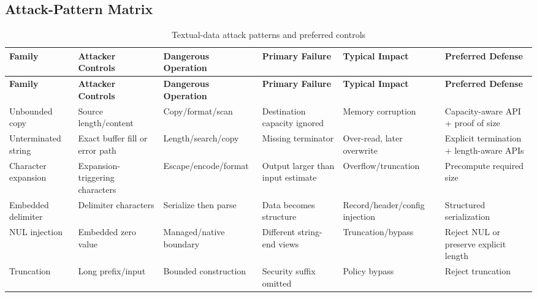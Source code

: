 \documentclass[11pt]{article}
\begin{document}
\begin{landscape}
\section{Attack-Pattern Matrix}

\small
\begin{longtable}{>{\raggedright\arraybackslash}p{\dimexpr 0.15217\dimexpr\linewidth-12\tabcolsep\relax\relax} >{\raggedright\arraybackslash}p{\dimexpr 0.15217\dimexpr\linewidth-12\tabcolsep\relax\relax} >{\raggedright\arraybackslash}p{\dimexpr 0.18478\dimexpr\linewidth-12\tabcolsep\relax\relax} >{\raggedright\arraybackslash}p{\dimexpr 0.18478\dimexpr\linewidth-12\tabcolsep\relax\relax} >{\raggedright\arraybackslash}p{\dimexpr 0.15217\dimexpr\linewidth-12\tabcolsep\relax\relax} >{\raggedright\arraybackslash}p{\dimexpr 0.17391\dimexpr\linewidth-12\tabcolsep\relax\relax}}
\caption{Textual-data attack patterns and preferred controls}\label{tab:attackmatrix}\\
\toprule
\textbf{Family} & \textbf{Attacker Controls} & \textbf{Dangerous Operation} & \textbf{Primary Failure} & \textbf{Typical Impact} & \textbf{Preferred Defense} \\
\midrule
\endfirsthead
\toprule
\textbf{Family} & \textbf{Attacker Controls} & \textbf{Dangerous Operation} & \textbf{Primary Failure} & \textbf{Typical Impact} & \textbf{Preferred Defense} \\
\midrule
\endhead
Unbounded copy & Source length/content & Copy/format/scan & Destination capacity ignored & Memory corruption & Capacity-aware API + proof of size \\
Unterminated string & Exact buffer fill or error path & Length/search/copy & Missing terminator & Over-read, later overwrite & Explicit termination + length-aware APIs \\
Character expansion & Expansion-triggering characters & Escape/encode/format & Output larger than input estimate & Overflow/truncation & Precompute required size \\
Embedded delimiter & Delimiter characters & Serialize then parse & Data becomes structure & Record/header/config injection & Structured serialization \\
NUL injection & Embedded zero value & Managed/native boundary & Different string-end views & Truncation/bypass & Reject NUL or preserve explicit length \\
Truncation & Long prefix/input & Bounded construction & Security suffix omitted & Policy bypass & Reject truncation \\

\end{longtable}
\end{landscape}
\end{document}

